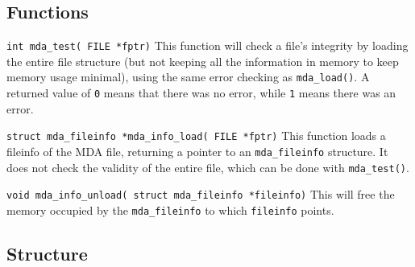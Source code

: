\documentclass[10pt,letterpaper]{article}
\begin{document}
\subsection{Functions}

\vspace{1.5ex}
\noindent
\verb+int mda_test( FILE *fptr)+ \linebreak
This function will check a file's integrity by loading the entire file
structure (but not keeping all the information in memory to keep
memory usage minimal), using the same error checking as
\verb+mda_load()+.  A returned value of \verb+0+ means that there was
no error, while \verb+1+ means there was an error.

\vspace{1.5ex}
\noindent
\verb+struct mda_fileinfo *mda_info_load( FILE *fptr)+ \linebreak This
function loads a fileinfo of the MDA file, returning a pointer to an
\verb+mda_fileinfo+ structure.  It does not check the validity of the
entire file, which can be done with \verb+mda_test()+.

\vspace{1.5ex}
\noindent
\verb+void mda_info_unload( struct mda_fileinfo *fileinfo)+ \linebreak 
This will free the memory occupied by the \verb+mda_fileinfo+ to which
\verb+fileinfo+ points.


\subsection{Structure}
\end{document}
